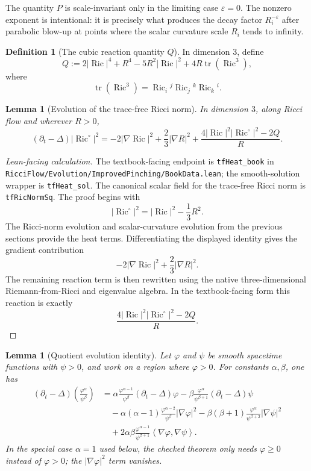 \documentclass[11pt]{article}
\theoremstyle{plain}
\newtheorem{lemma}[theorem]{Lemma}
\theoremstyle{definition}
\newtheorem{definition}[theorem]{Definition}
\theoremstyle{remark}
\newcommand{\Ric}{\operatorname{Ric}}
\newcommand{\tr}{\operatorname{tr}}
\newcommand{\ip}[2]{\left\langle #1,#2\right\rangle}
\newcommand{\norm}[1]{\left|#1\right|}
\newcommand{\eps}{\varepsilon}
\newcommand{\leanref}[1]{\nolinkurl{#1}}
\newcommand{\leanfile}[1]{\nolinkurl{#1}}
\newcommand{\rffile}[1]{\leanfile{#1}}
\begin{document}
The quantity \(P\) is scale-invariant only in the limiting case
\(\eps=0\).  The nonzero exponent is intentional: it is precisely what
produces the decay factor \(R_i^{-\eps}\) after parabolic blow-up at points
where the scalar curvature scale \(R_i\) tends to infinity.

\begin{definition}[The cubic reaction quantity $Q$]
\label{def:Q}
In dimension $3$, define
\[
Q
:=
2\norm{\Ric}^4
+R^4
-5R^2\norm{\Ric}^2
+4R\tr(\Ric^3),
\]
where
\[
\tr(\Ric^3)=\Ric_i{}^j\Ric_j{}^k\Ric_k{}^i.
\]
\end{definition}

\begin{lemma}[Evolution of the trace-free Ricci norm]
\label{lem:evol-tracefree-ricci-norm}
In dimension $3$, along Ricci flow and wherever $R>0$,
\[
(\partial_t-\Delta)\norm{\Ric^\circ}^2
=
-2\norm{\nabla\Ric}^2
+\frac23\norm{\nabla R}^2
+
\frac{4\norm{\Ric}^2\norm{\Ric^\circ}^2-2Q}{R}.
\]
\end{lemma}

\begin{proof}[Lean-facing calculation]
The textbook-facing endpoint is \leanref{tfHeat_book} in
\rffile{RicciFlow/Evolution/ImprovedPinching/BookData.lean}; the
smooth-solution wrapper is \leanref{tfHeat_sol}.  The canonical scalar field
for the trace-free Ricci norm is \leanref{tfRicNormSq}.  The proof begins with
\[
\norm{\Ric^\circ}^2=\norm{\Ric}^2-\frac13R^2.
\]
The Ricci-norm evolution and scalar-curvature evolution from the previous
sections provide the heat terms.  Differentiating the displayed identity gives
the gradient contribution
\[
-2\norm{\nabla\Ric}^2+\frac23\norm{\nabla R}^2.
\]
The remaining reaction term is then rewritten using the native three-dimensional
Riemann-from-Ricci and eigenvalue algebra.  In the textbook-facing form this
reaction is exactly
\[
\frac{4\norm{\Ric}^2\norm{\Ric^\circ}^2-2Q}{R}.
\]
\end{proof}

\begin{lemma}[Quotient evolution identity]
\label{lem:quotient-evolution}
Let $\varphi$ and $\psi$ be smooth spacetime functions with $\psi>0$, and work
on a region where $\varphi>0$. For constants $\alpha,\beta$, one has
\begin{align*}
(\partial_t-\Delta)\left(\frac{\varphi^\alpha}{\psi^\beta}\right)
&=
\alpha\frac{\varphi^{\alpha-1}}{\psi^\beta}(\partial_t-\Delta)\varphi
-
\beta\frac{\varphi^\alpha}{\psi^{\beta+1}}(\partial_t-\Delta)\psi
\\
&\quad
-
\alpha(\alpha-1)\frac{\varphi^{\alpha-2}}{\psi^\beta}\norm{\nabla\varphi}^2
-
\beta(\beta+1)\frac{\varphi^\alpha}{\psi^{\beta+2}}\norm{\nabla\psi}^2
\\
&\quad
+
2\alpha\beta\frac{\varphi^{\alpha-1}}{\psi^{\beta+1}}
\ip{\nabla\varphi}{\nabla\psi}.
\end{align*}
In the special case \(\alpha=1\) used below, the checked theorem only needs
\(\varphi\ge0\) instead of \(\varphi>0\); the
\(\norm{\nabla\varphi}^2\) term vanishes.
\end{lemma}
\end{document}
